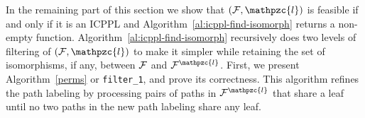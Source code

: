 \documentclass[11pt,
               envcountsect,
               envcountsame]
               {../lib/llncs2e/llncs}
\def\cF{{\cal F}}
\def\cl{\mathpzc{l}}
\def\xnoindent{\noindent} %
\begin{document}
\xnoindent In the remaining part of this section we show that $(\cF,
\cl)$ is feasible if and only if it is an ICPPL and
Algorithm~\ref{al:icppl-find-isomorph} returns a non-empty
function. Algorithm~\ref{al:icppl-find-isomorph} recursively does two levels of
filtering of $(\cF, \cl)$ to make it simpler while retaining the set
of isomorphisms, if any, between $\cF$ and $\cF^\cl$.
First, we present Algorithm~\ref{perms} or {\tt filter\_1}, and prove
its correctness.  This algorithm refines the path labeling by
processing pairs of paths in $\cF^\cl$ that share a leaf until no two
paths in the new path labeling share any leaf.
\end{document}
